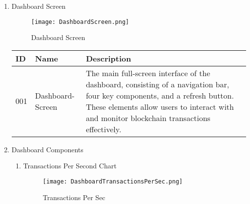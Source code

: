 \documentclass[conference]{IEEEtran}
\begin{document}
\begin{enumerate}[itemsep=2ex, parsep=1ex]
	\item Dashboard Screen

            \begin{figure}[h!]
                \centering
                \texttt{[image: DashboardScreen.png]}
                \caption{Dashboard Screen}
                \label{fig:DashboardScreen}
            \end{figure}
    
	      \begin{table}[h!]
	      	\def\arraystretch{1.24} \small
	      	\begin{tabular}{|p{1.2cm}|p{2.5cm}|p{4.0cm}|}
	      		\hline
	      		ID  & Name             & Description                                                                                                                                                                                                              \\
	      		\hline
	      		001 & Dashboard-Screen & The main full-screen interface of the dashboard, consisting of a navigation bar, four key components, and a refresh button. These elements allow users to interact with and monitor blockchain transactions effectively. \\
	      		\hline
	      	\end{tabular}
	      \end{table}
	      	      	      	      
	\item Dashboard Components
	      \begin{enumerate}[itemsep=2ex, parsep=1ex]
	      	\item Transactions Per Second Chart

\begin{figure}[h!]
    \centering
    \texttt{[image: DashboardTransactionsPerSec.png]}
    \caption{Transactions Per Sec}
    \label{fig:enter-label}
\end{figure}

\vspace{5cm}
            

\end{enumerate}
\end{enumerate}
\end{document}
